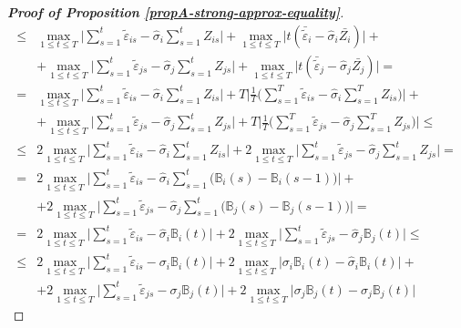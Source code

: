 \documentclass[a4paper,12pt]{article}
\begin{document}
\begin{proof}[\textnormal{\textbf{Proof of Proposition \ref{propA-strong-approx-equality}}}]
\begin{align*}
\le & \max_{1 \le t \le T} \Big| \sum\limits_{s=1}^t \widetilde{\varepsilon}_{is} - \widehat{\sigma}_i \sum\limits_{s=1}^t Z_{is} \Big| + \max_{1 \le t \le T} \Big| t (\bar{\widetilde{\varepsilon}}_{i} - \widehat{\sigma}_i \bar{Z_i}) \Big|+\\
& + \max_{1 \le t \le T} \Big| \sum\limits_{s=1}^t \widetilde{\varepsilon}_{js} - \widehat{\sigma}_j \sum\limits_{s=1}^t Z_{js} \Big| + \max_{1 \le t \le T} \Big| t (\bar{\widetilde{\varepsilon}}_{j} -\widehat{\sigma}_j \bar{Z_j}) \Big|= \\
= & \max_{1 \le t \le T} \Big| \sum\limits_{s=1}^t \widetilde{\varepsilon}_{is} - \widehat{\sigma}_i \sum\limits_{s=1}^t Z_{is} \Big| + T \Big| \frac{1}{T}\Big(\sum\limits_{s=1}^T \widetilde{\varepsilon}_{is} - \widehat{\sigma}_i \sum\limits_{s=1}^T Z_{is}\Big)\Big|+\\
& + \max_{1 \le t \le T} \Big| \sum\limits_{s=1}^t \widetilde{\varepsilon}_{js} - \widehat{\sigma}_j \sum\limits_{s=1}^t Z_{js} \Big| +  T \Big| \frac{1}{T}\Big(\sum\limits_{s=1}^T \widetilde{\varepsilon}_{js} -\widehat{\sigma}_j \sum\limits_{s=1}^T  Z_{js}\Big)\Big| \le \\
\le & 2 \max_{1 \le t \le T} \Big| \sum\limits_{s=1}^t \widetilde{\varepsilon}_{is} -\widehat{\sigma}_i \sum\limits_{s=1}^t Z_{is} \Big| + 2 \max_{1 \le t \le T} \Big| \sum\limits_{s=1}^t \widetilde{\varepsilon}_{js} -\widehat{\sigma}_j \sum\limits_{s=1}^t Z_{js} \Big| =\\
= & 2 \max_{1 \le t \le T} \Big| \sum\limits_{s=1}^t \widetilde{\varepsilon}_{is} - \widehat{\sigma}_i \sum\limits_{s=1}^t \big(\mathbb{B}_{i}(s) - \mathbb{B}_{i}(s-1) \big) \Big| +\\
& +  2 \max_{1 \le t \le T} \Big| \sum\limits_{s=1}^t \widetilde{\varepsilon}_{js} -\widehat{\sigma}_j \sum\limits_{s=1}^t \big(\mathbb{B}_{j}(s) - \mathbb{B}_{j}(s-1) \big) \Big| =\\
= & 2 \max_{1 \le t \le T} \Big| \sum\limits_{s=1}^t \widetilde{\varepsilon}_{is} - \widehat{\sigma}_i \mathbb{B}_{i}(t) \Big| + 2 \max_{1 \le t \le T} \Big| \sum\limits_{s=1}^t \widetilde{\varepsilon}_{js} - \widehat{\sigma}_j \mathbb{B}_{j}(t) \Big| \le\\
\le & 2 \max_{1 \le t \le T} \Big| \sum\limits_{s=1}^t \widetilde{\varepsilon}_{is} - \sigma_i \mathbb{B}_{i}(t) \Big| + 2 \max_{1 \le t \le T}\Big|\sigma_i \mathbb{B}_{i}(t) - \widehat{\sigma}_i \mathbb{B}_{i}(t)  \Big| +\\
&+ 2 \max_{1 \le t \le T} \Big| \sum\limits_{s=1}^t \widetilde{\varepsilon}_{js} - \sigma_j \mathbb{B}_{j}(t) \Big| + 2 \max_{1 \le t \le T} \Big| \sigma_j \mathbb{B}_{j}(t) - \widehat{\sigma}_j \mathbb{B}_{j}(t) \Big|

\end{align*}
\end{proof}
\end{document}
